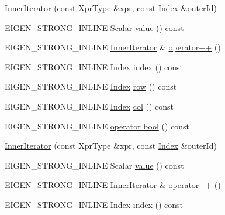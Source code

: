 \begin{DoxyCompactItemize}
\item 
\hyperlink{class_eigen_1_1_inner_iterator_abbcdcf4d5ecb4445654b7940204cb750}{Inner\+Iterator} (const Xpr\+Type \&xpr, const \hyperlink{namespace_eigen_a62e77e0933482dafde8fe197d9a2cfde}{Index} \&outer\+Id)
\item 
E\+I\+G\+E\+N\+\_\+\+S\+T\+R\+O\+N\+G\+\_\+\+I\+N\+L\+I\+NE Scalar \hyperlink{class_eigen_1_1_inner_iterator_ab04bccb41eb22ffcb92dc61125aab119}{value} () const
\item 
E\+I\+G\+E\+N\+\_\+\+S\+T\+R\+O\+N\+G\+\_\+\+I\+N\+L\+I\+NE \hyperlink{class_eigen_1_1_inner_iterator}{Inner\+Iterator} \& \hyperlink{class_eigen_1_1_inner_iterator_ae4ed2eece5291e23d870b7238878e2f1}{operator++} ()
\item 
E\+I\+G\+E\+N\+\_\+\+S\+T\+R\+O\+N\+G\+\_\+\+I\+N\+L\+I\+NE \hyperlink{namespace_eigen_a62e77e0933482dafde8fe197d9a2cfde}{Index} \hyperlink{class_eigen_1_1_inner_iterator_ac9e0e40b8aceb192a0e1c7d656148760}{index} () const
\item 
E\+I\+G\+E\+N\+\_\+\+S\+T\+R\+O\+N\+G\+\_\+\+I\+N\+L\+I\+NE \hyperlink{namespace_eigen_a62e77e0933482dafde8fe197d9a2cfde}{Index} \hyperlink{class_eigen_1_1_inner_iterator_a3ab6f3afdf62740623cdc9ecb14dc132}{row} () const
\item 
E\+I\+G\+E\+N\+\_\+\+S\+T\+R\+O\+N\+G\+\_\+\+I\+N\+L\+I\+NE \hyperlink{namespace_eigen_a62e77e0933482dafde8fe197d9a2cfde}{Index} \hyperlink{class_eigen_1_1_inner_iterator_a1d2ccb720e90bc6928064cc30c41fb93}{col} () const
\item 
E\+I\+G\+E\+N\+\_\+\+S\+T\+R\+O\+N\+G\+\_\+\+I\+N\+L\+I\+NE \hyperlink{class_eigen_1_1_inner_iterator_a0f11df2dfcd1c48c54aa29e605c09310}{operator bool} () const
\item 
\hyperlink{class_eigen_1_1_inner_iterator_abbcdcf4d5ecb4445654b7940204cb750}{Inner\+Iterator} (const Xpr\+Type \&xpr, const \hyperlink{namespace_eigen_a62e77e0933482dafde8fe197d9a2cfde}{Index} \&outer\+Id)
\item 
E\+I\+G\+E\+N\+\_\+\+S\+T\+R\+O\+N\+G\+\_\+\+I\+N\+L\+I\+NE Scalar \hyperlink{class_eigen_1_1_inner_iterator_ab04bccb41eb22ffcb92dc61125aab119}{value} () const
\item 
E\+I\+G\+E\+N\+\_\+\+S\+T\+R\+O\+N\+G\+\_\+\+I\+N\+L\+I\+NE \hyperlink{class_eigen_1_1_inner_iterator}{Inner\+Iterator} \& \hyperlink{class_eigen_1_1_inner_iterator_ae4ed2eece5291e23d870b7238878e2f1}{operator++} ()
\item 
E\+I\+G\+E\+N\+\_\+\+S\+T\+R\+O\+N\+G\+\_\+\+I\+N\+L\+I\+NE \hyperlink{namespace_eigen_a62e77e0933482dafde8fe197d9a2cfde}{Index} \hyperlink{class_eigen_1_1_inner_iterator_ac9e0e40b8aceb192a0e1c7d656148760}{index} () const

\end{DoxyCompactItemize}
